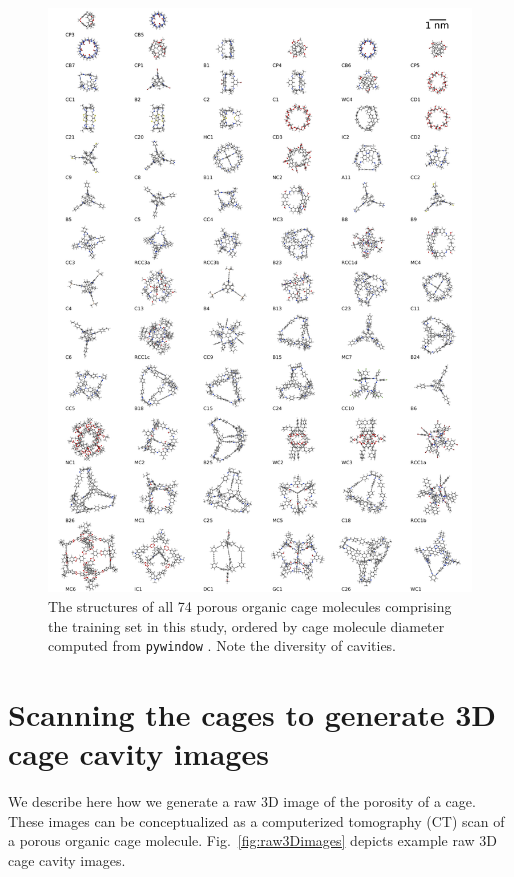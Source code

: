 \documentclass[journal=jacsat,manuscript=article,layout=traditional]{achemso}
\begin{document}
\begin{figure}
\centering
	\includegraphics[width=0.9\columnwidth]{../all_cages/grid_of_cages_labeled.pdf} %
	\caption{The structures of all 74 porous organic cage molecules \cite{miklitz2017computational,greenaway2018high} comprising the training set in this study, ordered by cage molecule diameter computed from \texttt{pywindow} \cite{miklitz2018pywindow}. Note the diversity of cavities.
	} \label{fig:cages}
\end{figure}

\section{Scanning the cages to generate 3D cage cavity images} We describe here how we generate a raw 3D image of the porosity of a cage. These images can be conceptualized as a computerized tomography (CT) scan of a porous organic cage molecule. Fig.~\ref{fig:raw3Dimages} depicts example raw 3D cage cavity images.
\end{document}
